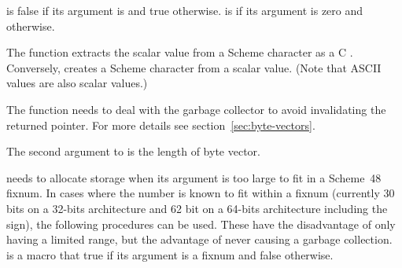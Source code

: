 \begin{protos}
\end{protos}

\noindent{} is false if its argument is
  and true otherwise.
  is  if its argument is zero
  and  otherwise.

The  function extracts the scalar value from
a Scheme character as a C .  Conversely,
 creates a Scheme character from a scalar
value.  (Note that ASCII values are also scalar values.)

The  function needs to deal with
 the garbage collector to avoid invalidating the returned pointer.
 For more details see section~\ref{sec:byte-vectors}.

The second argument to  is the length of
 byte vector.

 needs to allocate storage when
 its argument is too large to fit in a Scheme~48 fixnum.
In cases where the number is known to fit within a fixnum (currently 30 
 bits on a 32-bits architecture and 62 bit on a 64-bits architecture 
 including the sign), the following procedures can be used.
These have the disadvantage of only having a limited range, but
 the advantage of never causing a garbage collection.
 is a macro that true if its argument is a fixnum
 and false otherwise.

\begin{protos}
\end{protos}

